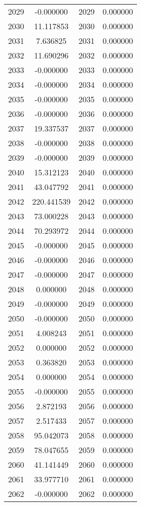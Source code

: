 \documentclass[12pt]{article}
\begin{document}
\begin{longtable}{@{}cccc@{}}
2029 & -0.000000 & 2029 & 0.000000 \\
2030 & 11.117853 & 2030 & 0.000000 \\
2031 & 7.636825 & 2031 & 0.000000 \\
2032 & 11.690296 & 2032 & 0.000000 \\
2033 & -0.000000 & 2033 & 0.000000 \\
2034 & -0.000000 & 2034 & 0.000000 \\
2035 & -0.000000 & 2035 & 0.000000 \\
2036 & -0.000000 & 2036 & 0.000000 \\
2037 & 19.337537 & 2037 & 0.000000 \\
2038 & -0.000000 & 2038 & 0.000000 \\
2039 & -0.000000 & 2039 & 0.000000 \\
2040 & 15.312123 & 2040 & 0.000000 \\
2041 & 43.047792 & 2041 & 0.000000 \\
2042 & 220.441539 & 2042 & 0.000000 \\
2043 & 73.000228 & 2043 & 0.000000 \\
2044 & 70.293972 & 2044 & 0.000000 \\
2045 & -0.000000 & 2045 & 0.000000 \\
2046 & -0.000000 & 2046 & 0.000000 \\
2047 & -0.000000 & 2047 & 0.000000 \\
2048 & 0.000000 & 2048 & 0.000000 \\
2049 & -0.000000 & 2049 & 0.000000 \\
2050 & -0.000000 & 2050 & 0.000000 \\
2051 & 4.008243 & 2051 & 0.000000 \\
2052 & 0.000000 & 2052 & 0.000000 \\
2053 & 0.363820 & 2053 & 0.000000 \\
2054 & 0.000000 & 2054 & 0.000000 \\
2055 & -0.000000 & 2055 & 0.000000 \\
2056 & 2.872193 & 2056 & 0.000000 \\
2057 & 2.517433 & 2057 & 0.000000 \\
2058 & 95.042073 & 2058 & 0.000000 \\
2059 & 78.047655 & 2059 & 0.000000 \\
2060 & 41.141449 & 2060 & 0.000000 \\
2061 & 33.977710 & 2061 & 0.000000 \\
2062 & -0.000000 & 2062 & 0.000000 \\

\end{longtable}
\end{document}
